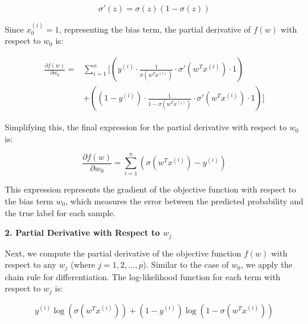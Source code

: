 \documentclass[a4paper, utf8]{ctexart}
\begin{document}
	\vspace{-.5em}
	\begin{equation}
		\sigma'(z) = \sigma(z)(1 - \sigma(z))
		\nonumber
	\end{equation}
	
	Since $x_0^{(i)} = 1$, representing the bias term, the partial derivative of $f(w)$ with respect to $w_0$ is:
	
	\vspace{-.5em}
	\begin{equation}
		\begin{aligned}
			\frac{\partial f(w)}{\partial w_0} = & \sum_{i=1}^{n} \Bigg[ \left( y^{(i)} \cdot \frac{1}{\sigma(w^T x^{(i)})} \cdot \sigma'(w^T x^{(i)}) \cdot 1 \right) \\
			&+ \left( (1 - y^{(i)}) \cdot \frac{1}{1 - \sigma(w^T x^{(i)})} \cdot \sigma'(w^T x^{(i)}) \cdot 1 \right) \Bigg]
		\end{aligned}
		\nonumber
	\end{equation}
	
	Simplifying this, the final expression for the partial derivative with respect to $w_0$ is:
	
	\vspace{-.5em}
	\begin{equation}
		\frac{\partial f(w)}{\partial w_0} = \sum_{i=1}^{n} \left( \sigma(w^T x^{(i)}) - y^{(i)} \right)
		\nonumber
	\end{equation}
	
	This expression represents the gradient of the objective function with respect to the bias term $w_0$, which measures the error between the predicted probability and the true label for each sample.
	
	\vspace{.5em}
	
	\textbf{2. Partial Derivative with Respect to $w_j$}
	
	\vspace{.5em}
	
	Next, we compute the partial derivative of the objective function $f(w)$ with respect to any $w_j$ (where $j = 1, 2, \dots, p$). Similar to the case of $w_0$, we apply the chain rule for differentiation. The log-likelihood function for each term with respect to $w_j$ is:
	
	\vspace{-.5em}
	\begin{equation}
		y^{(i)} \log(\sigma(w^T x^{(i)})) + (1 - y^{(i)}) \log(1 - \sigma(w^T x^{(i)}))
		\nonumber
	\end{equation}
	
\end{document}

